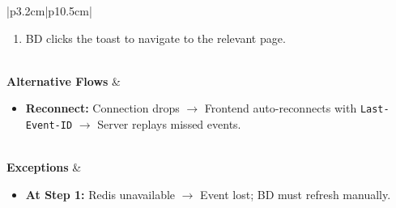 \documentclass[a4paper]{article}
\begin{document}
\begin{table}[H]
\begin{tabular}{|p{3.2cm}|p{10.5cm}|}
\begin{minipage}[t]{\linewidth}
\begin{enumerate}[nosep,leftmargin=*]
  \item BD clicks the toast to navigate to the relevant page.
\end{enumerate}
\end{minipage} \\
\hline
\textbf{Alternative Flows} &
\begin{minipage}[t]{\linewidth}
\begin{itemize}[nosep,leftmargin=*]
  \item \textbf{Reconnect:} Connection drops $\rightarrow$ Frontend 
  auto-reconnects with \texttt{Last-Event-ID} $\rightarrow$ Server 
  replays missed events.
\end{itemize}
\end{minipage} \\
\hline
\textbf{Exceptions} &
\begin{minipage}[t]{\linewidth}
\begin{itemize}[nosep,leftmargin=*]
  \item \textbf{At Step 1:} Redis unavailable $\rightarrow$ Event 
  lost; BD must refresh manually.
\end{itemize}
\end{minipage} \\
\hline
\end{tabular}
\end{table}
\end{document}
